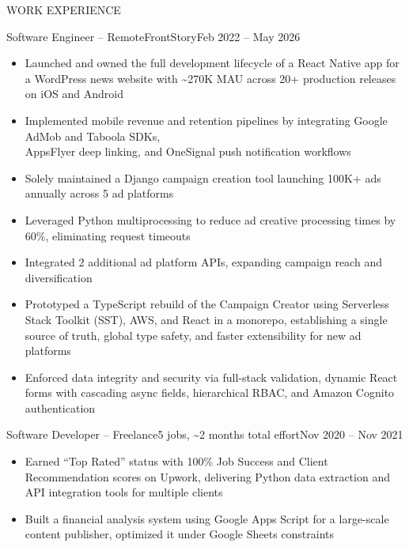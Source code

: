 \documentclass[]{mcdowellcv}
\begin{document}
	\makeheader
	
	
	\begin{cvsection}{WORK EXPERIENCE}
		\begin{cvsubsection}{Software Engineer -- Remote}{FrontStory}{Feb 2022 -- May 2026}
			\begin{itemize}
				\item Launched and owned the full development lifecycle of a React Native app for a WordPress news website with \textasciitilde270K MAU across 20+ production releases on iOS and Android
				\item Implemented mobile revenue and retention pipelines by integrating Google AdMob and Taboola SDKs,\\AppsFlyer deep linking, and OneSignal push notification workflows
				\item Solely maintained a Django campaign creation tool launching 100K+ ads annually across 5 ad platforms
				\item Leveraged Python multiprocessing to reduce ad creative processing times by 60\%, eliminating request timeouts
				\item Integrated 2 additional ad platform APIs, expanding campaign reach and diversification
				\item Prototyped a TypeScript rebuild of the Campaign Creator using Serverless Stack Toolkit (SST), AWS, and React in a monorepo, establishing a single source of truth, global type safety, and faster extensibility for new ad platforms
				\item Enforced data integrity and security via full-stack validation, dynamic React forms with cascading async fields, hierarchical RBAC, and Amazon Cognito authentication
			\end{itemize}
		\end{cvsubsection}
		\begin{cvsubsection}{Software Developer -- Freelance}{5 jobs, \textasciitilde2 months total effort}{Nov 2020 -- Nov 2021}
			\begin{itemize}
				\item Earned “Top Rated” status with 100\% Job Success and Client Recommendation scores on Upwork, delivering Python data extraction and API integration tools for multiple clients
				\item Built a financial analysis system using Google Apps Script for a large-scale content publisher, optimized it under Google Sheets constraints
			\end{itemize}
		\end{cvsubsection}
	\end{cvsection}
	
\end{document}
